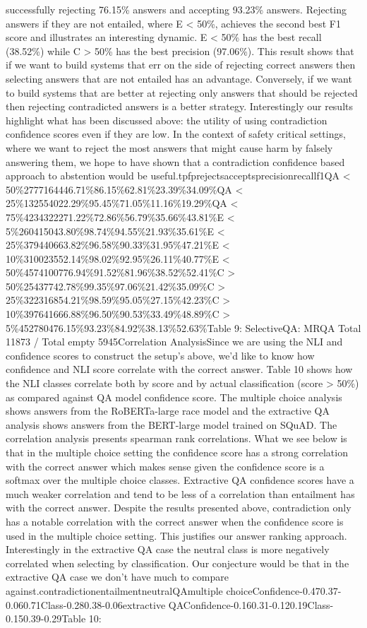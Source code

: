 \documentclass{scrbook}
\begin{document}
successfully rejecting 76.15\% answers and accepting 93.23\% answers. Rejecting answers if they are not entailed, where E {\textless} 50\%, achieves the second best F1 score and illustrates an interesting dynamic. E {\textless} 50\% has the best recall (38.52\%) while C {\textgreater} 50\% has the best precision (97.06\%). This result shows that if we want to build systems that err on the side of rejecting correct answers then selecting answers that are not entailed has an advantage. Conversely, if we want to build systems that are better at rejecting only answers that should be rejected then rejecting contradicted answers is a better strategy. Interestingly our results highlight what has been discussed above: the utility of using contradiction confidence scores even if they are low. In the context of safety critical settings, where we want to reject the most answers that might cause harm by falsely answering them, we hope to have shown that a contradiction confidence based approach to abstention would be useful.tpfprejectsacceptsprecisionrecallf1QA {\textless} 50\%2777164446.71\%86.15\%62.81\%23.39\%34.09\%QA {\textless} 25\%132554022.29\%95.45\%71.05\%11.16\%19.29\%QA {\textless} 75\%4234322271.22\%72.86\%56.79\%35.66\%43.81\%E {\textless} 5\%260415043.80\%98.74\%94.55\%21.93\%35.61\%E {\textless} 25\%379440663.82\%96.58\%90.33\%31.95\%47.21\%E {\textless} 10\%310023552.14\%98.02\%92.95\%26.11\%40.77\%E {\textless} 50\%4574100776.94\%91.52\%81.96\%38.52\%52.41\%C {\textgreater} 50\%25437742.78\%99.35\%97.06\%21.42\%35.09\%C {\textgreater} 25\%322316854.21\%98.59\%95.05\%27.15\%42.23\%C {\textgreater} 10\%397641666.88\%96.50\%90.53\%33.49\%48.89\%C {\textgreater} 5\%452780476.15\%93.23\%84.92\%38.13\%52.63\%Table 9: SelectiveQA: MRQA Total 11873 / Total empty 5945Correlation AnalysisSince we are using the NLI and confidence scores to construct the setup’s above, we’d like to know how confidence and NLI score correlate with the correct answer. Table 10 shows how the NLI classes correlate both by score and by actual classification (score {\textgreater} 50\%) as compared against QA model confidence score. The multiple choice analysis shows answers from the RoBERTa-large race model and the extractive QA analysis shows answers from the BERT-large model trained on SQuAD. The correlation analysis presents spearman rank correlations. What we see below is that in the multiple choice setting the confidence score has a strong correlation with the correct answer which makes sense given the confidence score is a softmax over the multiple choice classes. Extractive QA confidence scores have a much weaker correlation and tend to be less of a correlation than entailment has with the correct answer. Despite the results presented above, contradiction only has a notable correlation with the correct answer when the confidence score is used in the multiple choice setting. This justifies our answer ranking approach. Interestingly in the extractive QA case the neutral class is more negatively correlated when selecting by classification. Our conjecture would be that in the extractive QA case we don’t have much to compare against.contradictionentailmentneutralQAmultiple choiceConfidence-0.470.37-0.060.71Class-0.280.38-0.06extractive QAConfidence-0.160.31-0.120.19Class-0.150.39-0.29Table 10: 
\end{document}
